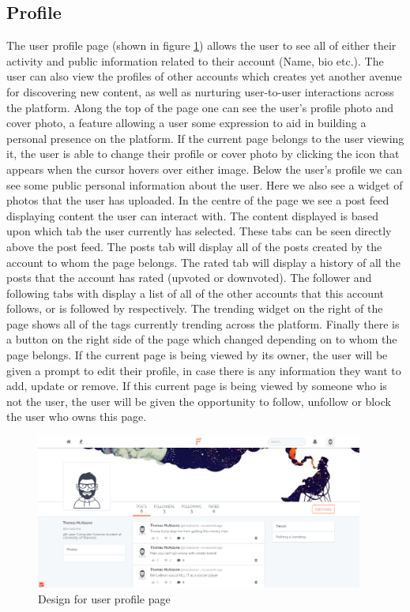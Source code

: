 \subsection{Profile}
The user profile page (shown in figure \ref{fig:user_profile}) allows the user to see all of either their activity and public information related to their account (Name, bio etc.). The user can also view the profiles of other accounts which creates yet another avenue for discovering new content, as well as nurturing user-to-user interactions across the platform. Along the top of the page one can see the user's profile photo and cover photo, a feature allowing a user some expression to aid in building a personal presence on the platform. If the current page belongs to the user viewing it, the user is able to change their profile or cover photo by clicking the icon that appears when the cursor hovers over either image. Below the user's profile we can see some public personal information about the user. Here we also see a widget of photos that the user has uploaded. In the centre of the page we see a post feed displaying content the user can interact with. The content displayed is based upon which tab the user currently has selected. These tabs can be seen directly above the post feed. The posts tab will display all of the posts created by the account to whom the page belongs. The rated tab will display a history of all the posts that the account has rated (upvoted or downvoted). The follower and following tabs with display a list of all of the other accounts that this account follows, or is followed by respectively. The trending widget on the right of the page shows all of the tags currently trending across the platform. Finally there is a button on the right side of the page which changed depending on to whom the page belongs. If the current page is being viewed by its owner, the user will be given a prompt to edit their profile, in case there is any information they want to add, update or remove. If this current page is being viewed by someone who is not the user, the user will be given the opportunity to follow, unfollow or block the user who owns this page.

\begin{figure}[H]
\centering
\includegraphics[height=2in]{Images/Design/user_profile}
\caption{Design for user profile page}
\label{fig:user_profile}
\end{figure}

